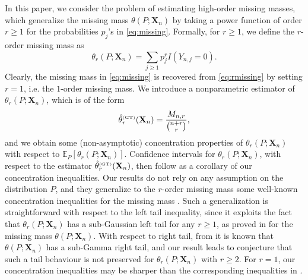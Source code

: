 \documentclass{article}
\newcommand{\1}{\boldsymbol{1}}
\theoremstyle{plain}
\begin{document}
In this paper, we consider the problem of estimating high-order missing masses, which generalize the missing mass $\theta(P;\mathbf{X}_{n})$ by taking a power function of order $r\geq1$ for the probabilities $p_{j}$'s in \eqref{eq:missing}. Formally, for $r\geq1$, we define the $r$-order missing mass as
\begin{equation} \label{eq:rmissing}
\theta_{r}(P;\mathbf{X}_{n})=\sum_{j\geq1}p^{r}_{j}I(Y_{n,j}=0).
\end{equation}
Clearly, the missing mass in \eqref{eq:missing} is recovered from \eqref{eq:rmissing} by setting $r=1$, i.e. the $1$-order missing mass. We introduce a nonparametric estimator of $\theta_r(P;\mathbf{X}_{n})$, which is of the form
\begin{displaymath}
\hat{\theta}_{r}^{\text{\tiny{(GT)}}}(\mathbf{X}_{n})=\frac{M_{n,r}}{{n+r\choose r}},
\end{displaymath}
and we obtain some (non-asymptotic) concentration properties of $\theta_r(P;\mathbf{X}_{n})$ with respect to $\mathbb{E}_{P}[\theta_r(P;\mathbf{X}_{n})]$. Confidence intervals for $\theta_r(P;\mathbf{X}_{n})$, with respect to the estimator $\hat{\theta}_{r}^{\text{\tiny{(GT)}}}(\mathbf{X}_{n})$, then follow as a corollary of our concentration inequalities. Our results do not rely on any assumption on the distribution $P$, and they generalize to the $r$-order missing mass some well-known concentration inequalities for the missing mass \cite{McA(03),Oha(12),Ben(17)}. Such a generalization is straightforward with respect to the left tail inequality, since it exploits the fact that $\theta_r(P;\mathbf{X}_{n})$ has a sub-Gaussian left tail for any $r\geq1$, as proved in \cite{McA(03),Ben(17)} for the missing mass $\theta(P;\mathbf{X}_{n})$. With respect to right tail, from \cite{Ben(17)} it is known that $\theta(P;\mathbf{X}_{n})$ has a sub-Gamma right tail, and our result leads to conjecture that such a tail behaviour is not preserved for $\theta_r(P;\mathbf{X}_{n})$ with $r\geq2$. For $r=1$, our concentration inequalities may be sharper than the corresponding inequalities in \cite{Ben(17)}. 
\end{document}
